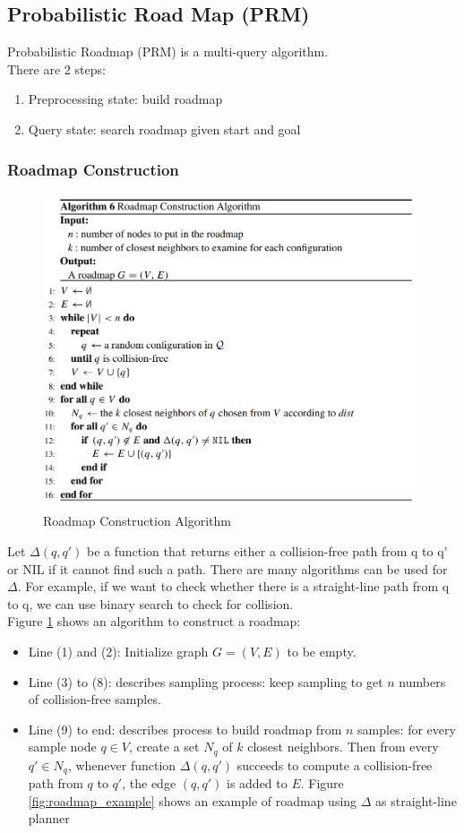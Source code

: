 \documentclass[11pt]{article}
\begin{document}
\subsection{Probabilistic Road Map (PRM)}
Probabilistic Roadmap (PRM) is a multi-query algorithm.\\
There are 2 steps:
\begin{enumerate}
\item Preprocessing state: build roadmap
\item Query state: search roadmap given start and goal
\end{enumerate}

\subsubsection{Roadmap Construction}
\begin{figure}[h]
\includegraphics{PRM}
\centering
\caption{Roadmap Construction Algorithm}
\label{fig:roadmap_alg}
\end{figure}
Let $\Delta(q, q')$ be a function that returns either a collision-free path from q to q' or NIL if it cannot find such a path. There are many algorithms can be used for $\Delta$. For example, if we want to check whether there is a straight-line path from q to q, we can use binary search to check for collision.\\
Figure \ref{fig:roadmap_alg} shows an algorithm to construct a roadmap:
\begin{itemize}
\item Line (1) and (2): Initialize graph $G=(V,E)$ to be empty.
\item Line (3) to (8): describes sampling process: keep sampling to get $n$ numbers of collision-free samples.
\item Line (9) to end: describes process to build roadmap from $n$ samples: for every sample node $q\in V$, create a set $N_q$ of $k$ closest neighbors. Then from every $q' \in N_q$, whenever function $\Delta(q, q')$ succeeds to compute a collision-free path from $q$ to $q'$, the edge $(q,q')$ is added to $E$. Figure \ref{fig:roadmap_example} shows an example of roadmap using $\Delta$ as straight-line planner
\end{itemize}
\end{document}
